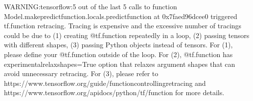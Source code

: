 \documentclass[letterpaper,10pt,english]{sphinxmanual}
\begin{document}
\begin{sphinxVerbatim}[commandchars=\\\{\}]
 
  \PYG{p}{[}   \PYG{p}{]}
             

\end{sphinxVerbatim}

\begin{sphinxVerbatim}[commandchars=\\\{\}]
WARNING:tensorflow:5 out of the last 5 calls to \PYGZlt{}function Model.make\PYGZus{}predict\PYGZus{}function.\PYGZlt{}locals\PYGZgt{}.predict\PYGZus{}function at 0x7faed96dcee0\PYGZgt{} triggered tf.function retracing. Tracing is expensive and the excessive number of tracings could be due to (1) creating @tf.function repeatedly in a loop, (2) passing tensors with different shapes, (3) passing Python objects instead of tensors. For (1), please define your @tf.function outside of the loop. For (2), @tf.function has experimental\PYGZus{}relax\PYGZus{}shapes=True option that relaxes argument shapes that can avoid unnecessary retracing. For (3), please refer to https://www.tensorflow.org/guide/function\PYGZsh{}controlling\PYGZus{}retracing and https://www.tensorflow.org/api\PYGZus{}docs/python/tf/function for  more details.
\end{sphinxVerbatim}

\noindent{}
\end{document}
